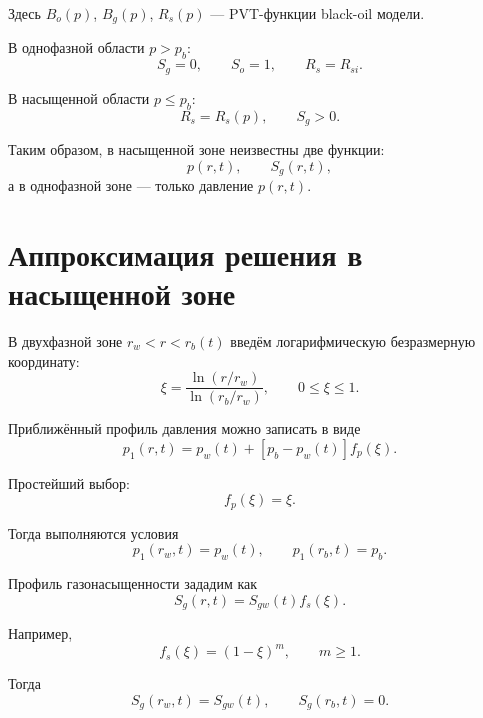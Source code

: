 \documentclass[12pt,a4paper]{article}
\begin{document}
Здесь $B_o(p)$, $B_g(p)$, $R_s(p)$ --- PVT-функции black-oil модели.

В однофазной области $p>p_b$:
\begin{equation}
    S_g = 0, \qquad S_o = 1, \qquad R_s = R_{si}.
\end{equation}

В насыщенной области $p \leq p_b$:
\begin{equation}
    R_s = R_s(p), \qquad S_g > 0.
\end{equation}

Таким образом, в насыщенной зоне неизвестны две функции:
\begin{equation}
    p(r,t), \qquad S_g(r,t),
\end{equation}
а в однофазной зоне --- только давление $p(r,t)$.

\section{Аппроксимация решения в насыщенной зоне}

В двухфазной зоне $r_w<r<r_b(t)$ введём логарифмическую безразмерную координату:
\begin{equation}
    \xi = \frac{\ln(r/r_w)}{\ln(r_b/r_w)},
    \qquad
    0 \leq \xi \leq 1.
\end{equation}

Приближённый профиль давления можно записать в виде
\begin{equation}
    p_1(r,t)
    =
    p_w(t)
    +
    \left[p_b - p_w(t)\right] f_p(\xi).
\end{equation}

Простейший выбор:
\begin{equation}
    f_p(\xi)=\xi.
\end{equation}

Тогда выполняются условия
\begin{equation}
    p_1(r_w,t)=p_w(t),
    \qquad
    p_1(r_b,t)=p_b.
\end{equation}

Профиль газонасыщенности зададим как
\begin{equation}
    S_g(r,t)
    =
    S_{gw}(t) f_s(\xi).
\end{equation}

Например,
\begin{equation}
    f_s(\xi)=(1-\xi)^m,
    \qquad m \geq 1.
\end{equation}

Тогда
\begin{equation}
    S_g(r_w,t)=S_{gw}(t),
    \qquad
    S_g(r_b,t)=0.
\end{equation}
\end{document}
